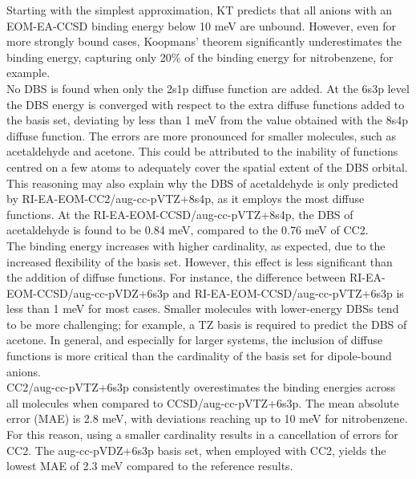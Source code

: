 Starting with the simplest approximation, KT predicts that all anions with an EOM-EA-CCSD binding energy below 10 meV are unbound. However, even for more strongly bound cases, Koopmans' theorem significantly underestimates the binding energy, capturing only 20\% of the binding energy for nitrobenzene, for example.\\

No DBS is found when only the 2s1p diffuse function are added. At the 6s3p level the DBS energy is converged with respect to the extra diffuse functions added to the basis set, deviating by less than 1 meV from the value obtained with the 8s4p diffuse function. The errors are more pronounced for smaller molecules, such as acetaldehyde and acetone. This could be attributed to the inability of functions centred on a few atoms to adequately cover the spatial extent of the DBS orbital. This reasoning may also explain why the DBS of acetaldehyde is only predicted by RI-EA-EOM-CC2/aug-cc-pVTZ+8s4p, as it employs the most diffuse functions. At the RI-EA-EOM-CCSD/aug-cc-pVTZ+8s4p, the DBS of acetaldehyde is found to be 0.84 meV, compared to the 0.76 meV of CC2.\\

The binding energy increases with higher cardinality, as expected, due to the increased flexibility of the basis set. However, this effect is less significant than the addition of diffuse functions. For instance, the difference between RI-EA-EOM-CCSD/aug-cc-pVDZ+6s3p and RI-EA-EOM-CCSD/aug-cc-pVTZ+6s3p is less than 1 meV for most cases. Smaller molecules with lower-energy DBSs tend to be more challenging; for example, a TZ basis is required to predict the DBS of acetone. In general, and especially for larger systems, the inclusion of diffuse functions is more critical than the cardinality of the basis set for dipole-bound anions.\\

CC2/aug-cc-pVTZ+6s3p consistently overestimates the binding energies across all molecules when compared to CCSD/aug-cc-pVTZ+6s3p. The mean absolute error (MAE) is 2.8 meV, with deviations reaching up to 10 meV for nitrobenzene. For this reason, using a smaller cardinality results in a cancellation of errors for CC2.
The aug-cc-pVDZ+6s3p basis set, when employed with CC2, yields the lowest MAE of 2.3 meV compared to the reference results.

